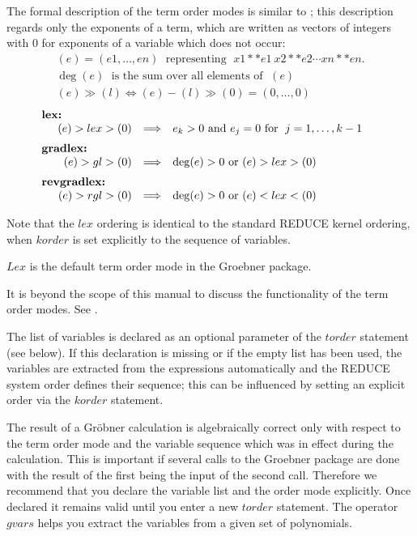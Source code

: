 The formal description of the term order modes is similar to
\cite{Kredel:88}; this description regards only the exponents of a term,
which are written as vectors of integers with $0$ for exponents of a
variable which does not occur:
\[
\begin{array}{l}
  (e) = (e1,\ldots , en) \;\mbox{ representing }\; x1**e1 \ x2**e2 \cdots
  xn**en. \\
  \deg(e) \; \mbox{ is the sum over all elements of } \;(e) \\
  (e) \gg (l) \Longleftrightarrow (e)-(l)\gg (0) = (0,\ldots ,0)
\end{array}
\]
\[
\begin{array}{rll}
\multicolumn{1}{l}{\hspace*{-.5cm}\mbox{\bf lex:}} \\
  (e) > lex > (0) & \Longrightarrow  & e_k > 0 \mbox{ and } e_j =0
\mbox{ for }\; j=1,\ldots , k-1\vspace*{2mm} \\
\multicolumn{1}{l}{\hspace*{-.5cm}\mbox{\bf
gradlex:}} \\
  (e) >gl> (0)  & \Longrightarrow  & \deg(e)>0  \mbox { or } (e) >lex>
(0)\vspace*{2mm} \\
\multicolumn{1}{l}{\hspace*{-.5cm}\mbox{\bf
revgradlex:}}\\
  (e) >rgl> (0) & \Longrightarrow & \deg(e)>0  \mbox{ or }(e)  <lex<
(0)
\end{array}
\]

Note that the $lex$ ordering is identical to the standard REDUCE
kernel ordering, when $korder$ is set explicitly to the sequence of
variables.

$Lex$ is the default term order mode in the Groebner package.

It is beyond the scope of this manual to discuss the functionality of
the term order modes. See \cite{Buchberger:88}.

The list of variables is declared as an optional parameter of the
$torder$ statement (see below). If this declaration is missing
or if the empty list has been used, the variables are extracted from
the expressions automatically and the REDUCE system order defines
their sequence; this can be influenced by setting an explicit order
via the $korder$ statement.

The result of a Gr\"obner calculation is algebraically correct only
with respect to the term order mode and the variable sequence
which was in effect during the calculation. This is important if
several calls to the Groebner package are done with the result of the
first being the input of the second call. Therefore we recommend
that you declare the variable list and the order mode explicitly.
Once declared it remains valid until you enter a new $torder$
statement. The operator $gvars$ helps you extract the variables
from a given set of polynomials.

